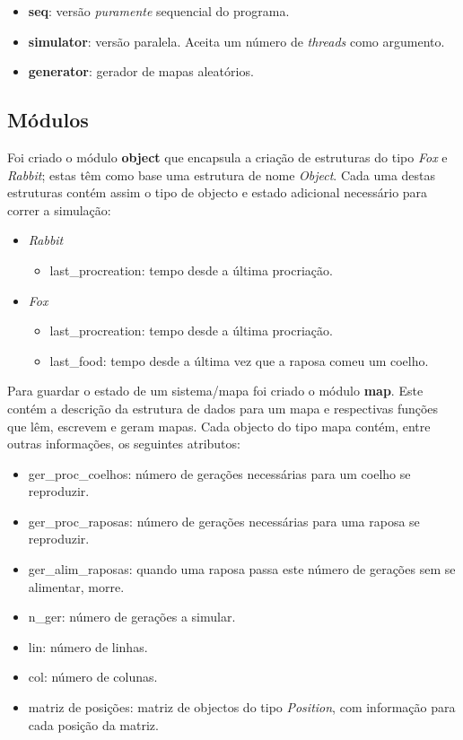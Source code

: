 \documentclass[12pt]{article}
\begin{document}
\begin{itemize}
  \item \textbf{seq}: versão \textit{puramente} sequencial do programa.
  \item \textbf{simulator}: versão paralela. Aceita um número de \textit{threads} como argumento.
  \item \textbf{generator}: gerador de mapas aleatórios.
\end{itemize}

\subsection{Módulos}

Foi criado o módulo \textbf{object} que encapsula a criação de estruturas do
tipo \textit{Fox} e \textit{Rabbit}; estas têm como base uma estrutura de nome \textit{Object}.
Cada uma destas estruturas contém assim o tipo de objecto e estado adicional necessário para correr a simulação:

\begin{itemize}
  \item \textit{Rabbit}
  \begin{itemize}
    \item last\_procreation: tempo desde a última procriação.
  \end{itemize}
  \item \textit{Fox}
  \begin{itemize}
    \item last\_procreation: tempo desde a última procriação.
    \item last\_food: tempo desde a última vez que a raposa comeu um coelho.
  \end{itemize}
\end{itemize}

Para guardar o estado de um sistema/mapa foi criado o módulo \textbf{map}. Este
contém a descrição da estrutura de dados para um mapa e respectivas funções que lêm,
escrevem e geram mapas. Cada objecto do tipo mapa contém, entre outras informações,
os seguintes atributos:

\begin{itemize}
  \item ger\_proc\_coelhos: número de gerações necessárias para um coelho se reproduzir.
  \item ger\_proc\_raposas: número de gerações necessárias para uma raposa se reproduzir.
  \item ger\_alim\_raposas: quando uma raposa passa este número de gerações sem se alimentar, morre.
  \item n\_ger: número de gerações a simular.
  \item lin: número de linhas.
  \item col: número de colunas.
  \item matriz de posições: matriz de objectos do tipo \textit{Position}, com informação para cada posição da matriz.
\end{itemize}
\end{document}
